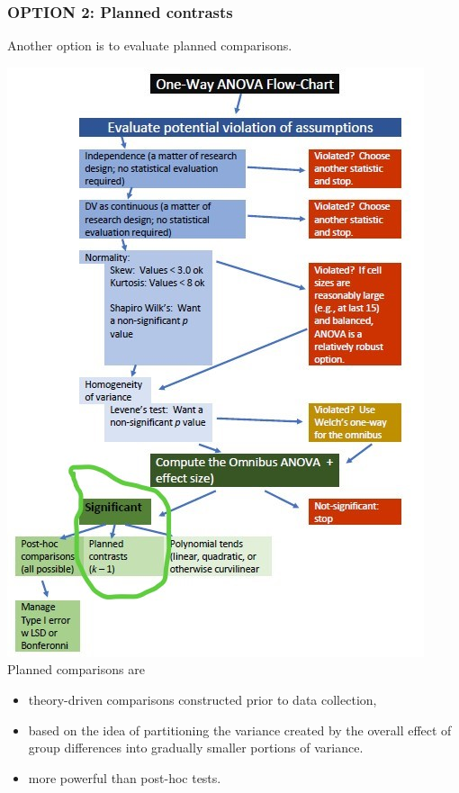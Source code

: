 \documentclass[
  english,
]{book}
\providecommand{\tightlist}{%
  \setlength{\itemsep}{0pt}\setlength{\parskip}{0pt}}
\begin{document}
\hypertarget{option-2-planned-contrasts}{%
\subsubsection{OPTION 2: Planned contrasts}\label{option-2-planned-contrasts}}

Another option is to evaluate planned comparisons.

\includegraphics{images/OnewayWrkFlw_planned.jpg}
Planned comparisons are

\begin{itemize}
\tightlist
\item
  theory-driven comparisons constructed prior to data collection,
\item
  based on the idea of partitioning the variance created by the overall effect of group differences into gradually smaller portions of variance.
\item
  more powerful than post-hoc tests.
\end{itemize}
\end{document}
